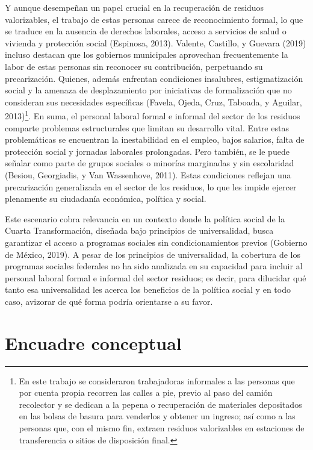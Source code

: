\documentclass[
  spanish,
  11.5pt,
  170mm x 240mmpaper,
]{scrbook}
\begin{document}
Y aunque desempeñan un papel crucial en la recuperación de residuos
valorizables, el trabajo de estas personas carece de reconocimiento
formal, lo que se traduce en la ausencia de derechos laborales, acceso a
servicios de salud o vivienda y protección social (Espinosa, 2013).
Valente, Castillo, y Guevara (2019) incluso destacan que los gobiernos
municipales aprovechan frecuentemente la labor de estas personas sin
reconocer su contribución, perpetuando su precarización. Quienes, además
enfrentan condiciones insalubres, estigmatización social y la amenaza de
desplazamiento por iniciativas de formalización que no consideran sus
necesidades específicas (Favela, Ojeda, Cruz, Taboada, y Aguilar,
2013)\footnote{En este trabajo se consideraron trabajadoras informales a
  las personas que por cuenta propia recorren las calles a pie, previo
  al paso del camión recolector y se dedican a la pepena o recuperación
  de materiales depositados en las bolsas de basura para venderlos y
  obtener un ingreso; así como a las personas que, con el mismo fin,
  extraen residuos valorizables en estaciones de transferencia o sitios
  de disposición final.}. En suma, el personal laboral formal e informal
del sector de los residuos comparte problemas estructurales que limitan
su desarrollo vital. Entre estas problemáticas se encuentran la
inestabilidad en el empleo, bajos salarios, falta de protección social y
jornadas laborales prolongadas. Pero también, se le puede señalar como
parte de grupos sociales o minorías marginadas y sin escolaridad
(Besiou, Georgiadis, y Van Wassenhove, 2011). Estas condiciones reflejan
una precarización generalizada en el sector de los residuos, lo que les
impide ejercer plenamente su ciudadanía económica, política y social.

Este escenario cobra relevancia en un contexto donde la política social
de la Cuarta Transformación, diseñada bajo principios de universalidad,
busca garantizar el acceso a programas sociales sin condicionamientos
previos (Gobierno de México, 2019). A pesar de los principios de
universalidad, la cobertura de los programas sociales federales no ha
sido analizada en su capacidad para incluir al personal laboral formal e
informal del sector residuos; es decir, para dilucidar qué tanto esa
universalidad les acerca los beneficios de la política social y en todo
caso, avizorar de qué forma podría orientarse a su favor.


\chapter{Encuadre conceptual}\label{encuadre-conceptual}
\end{document}
